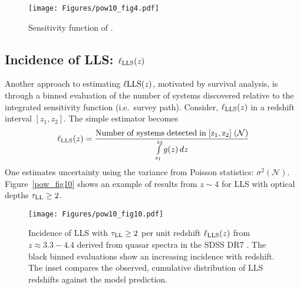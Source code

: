 \documentclass[graybox]{svmult}
\def\intl{\int\limits}
\begin{document}
%
\begin{figure}[b]
\sidecaption
\texttt{[image: Figures/pow10\_fig4.pdf]}
%
%
\caption{Sensitivity function of \cite{pow10}.
}
\label{fig:pow_fig4}       %
\end{figure}



\subsection{Incidence of LLS: $\ell_{\rm LLS}(z)$}

Another approach to estimating $\ell{\rm LLS}(z)$,
motivated by survival analysis, is through a binned
evaluation of the number of systems discovered relative
to the integrated sensitivity function (i.e.\ survey path).
Consider, $\ell_{\rm LLS}(z)$ in a redshift interval
$[z_1,z_2]$.  The simple estimator becomes
\begin{equation}
\ell_{\rm LLS}(z) = \frac{\rm Number \; of \; systems \; detected \; 
in \; [z_1,z_2] \;
(\mathcal{N})}{\intl_{z_1}^{z_2} g(z) \, dz}
\end{equation}
One estimates uncertainty using
the variance from Poisson statistics: $\sigma^2 (\mathcal{N})$.
Figure~\ref{pow_fig10} shows an example of results
from $z \sim 4$ for LLS with optical depths
$\tau_{\rm LL} \ge 2$.

%
\begin{figure}[b]
\sidecaption
\texttt{[image: Figures/pow10\_fig10.pdf]}
%
%
\caption{Incidence of LLS with $\tau_{\rm LL} \ge 2$
per unit redshift $\ell_{\rm LLS}(z)$ from $z\approx 3.3-4.4$
derived from quasar spectra in the SDSS DR7 \cite{pow10}.
The black binned evaluations show an increasing incidence
with redshift.
The inset compares the observed, cumulative distribution of
LLS redshifts against the model prediction.
}
\label{fig:pow_fig4}       %
\end{figure}
\end{document}
